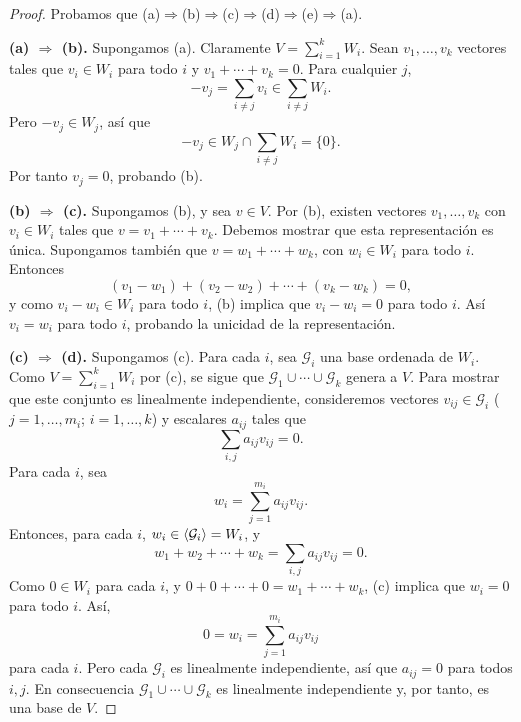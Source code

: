 \documentclass[12pt,a4paper]{book}
\begin{document}
    \begin{proof}
        Probamos que (a)$\Rightarrow$(b)$\Rightarrow$(c)$\Rightarrow$(d)$\Rightarrow$(e)$\Rightarrow$(a).

        \textbf{(a) $\Rightarrow$ (b).} Supongamos (a). Claramente $V=\sum_{i=1}^{k}W_i$. Sean $v_1,\dots,v_k$ vectores tales que $v_i\in W_i$ para todo $i$ y $v_1+\cdots+v_k=0$. Para cualquier $j$,
        \begin{equation*}
            -v_j=\sum_{i\neq j}v_i\in\sum_{i\neq j}W_i.
        \end{equation*}
        Pero $-v_j\in W_j$, así que
        \begin{equation*}
            -v_j\in W_j\cap\sum_{i\neq j}W_i=\{0\}.
        \end{equation*}
        Por tanto $v_j=0$, probando (b).

        \textbf{(b) $\Rightarrow$ (c).} Supongamos (b), y sea $v\in V$. Por (b), existen vectores $v_1,\dots,v_k$ con $v_i\in W_i$ tales que $v=v_1+\cdots+v_k$. Debemos mostrar que esta representación es única. Supongamos también que $v=w_1+\cdots+w_k$, con $w_i\in W_i$ para todo $i$. Entonces
        \begin{equation*}
            (v_1-w_1)+(v_2-w_2)+\cdots+(v_k-w_k)=0,
        \end{equation*}
        y como $v_i-w_i\in W_i$ para todo $i$, (b) implica que $v_i-w_i=0$ para todo $i$. Así $v_i=w_i$ para todo $i$, probando la unicidad de la representación.

        \textbf{(c) $\Rightarrow$ (d).} Supongamos (c). Para cada $i$, sea $\mathcal{G}_i$ una base ordenada de $W_i$. Como $V=\sum_{i=1}^{k}W_i$ por (c), se sigue que $\mathcal{G}_1\cup\cdots\cup\mathcal{G}_k$ genera a $V$. Para mostrar que este conjunto es linealmente independiente, consideremos vectores $v_{ij}\in\mathcal{G}_i$ ($j=1,\dots,m_i$; $i=1,\dots,k$) y escalares $a_{ij}$ tales que
        \begin{equation*}
            \sum_{i,j}a_{ij}v_{ij}=0.
        \end{equation*}
        Para cada $i$, sea
        \begin{equation*}
            w_i=\sum_{j=1}^{m_i}a_{ij}v_{ij}.
        \end{equation*}
        Entonces, para cada $i$, $w_i\in\langle \mathcal{G}_i \rangle=W_i$, y
        \begin{equation*}
            w_1+w_2+\cdots+w_k=\sum_{i,j}a_{ij}v_{ij}=0.
        \end{equation*}
        Como $0\in W_i$ para cada $i$, y $0+0+\cdots+0=w_1+\cdots+w_k$, (c) implica que $w_i=0$ para todo $i$. Así,
        \begin{equation*}
            0=w_i=\sum_{j=1}^{m_i}a_{ij}v_{ij}
        \end{equation*}
        para cada $i$. Pero cada $\mathcal{G}_i$ es linealmente independiente, así que $a_{ij}=0$ para todos $i,j$. En consecuencia $\mathcal{G}_1\cup\cdots\cup\mathcal{G}_k$ es linealmente independiente y, por tanto, es una base de $V$.


\end{proof}
\end{document}
